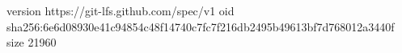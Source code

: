 version https://git-lfs.github.com/spec/v1
oid sha256:6e6d08930e41c94854c48f14740c7fc7f216db2495b49613bf7d768012a3440f
size 21960
